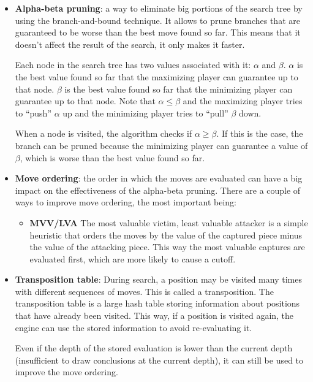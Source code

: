 \begin{itemize}
\item \textbf{Alpha-beta pruning}: a way to eliminate big portions of the search tree by using the branch-and-bound technique. It allows to prune branches that are guaranteed to be worse than the best move found so far. This means that it doesn't affect the result of the search, it only makes it faster.

Each node in the search tree has two values associated with it: $\alpha$ and $\beta$. $\alpha$ is the best value found so far that the maximizing player can guarantee up to that node. $\beta$ is the best value found so far that the minimizing player can guarantee up to that node. Note that $\alpha \le \beta$ and the maximizing player tries to \enquote{push} $\alpha$ up and the minimizing player tries to \enquote{pull} $\beta$ down.

When a node is visited, the algorithm checks if $\alpha \ge \beta$. If this is the case, the branch can be pruned because the minimizing player can guarantee a value of $\beta$, which is worse than the best value found so far.

\item \textbf{Move ordering}: the order in which the moves are evaluated can have a big impact on the effectiveness of the alpha-beta pruning. There are a couple of ways to improve move ordering, the most important being:
\begin{itemize}
\item \textbf{MVV/LVA} The most valuable victim, least valuable attacker is a simple heuristic that orders the moves by the value of the captured piece minus the value of the attacking piece. This way the most valuable captures are evaluated first, which are more likely to cause a cutoff.
\end{itemize}

\item \textbf{Transposition table}: During search, a position may be visited many times with different sequences of moves. This is called a transposition. The transposition table is a large hash table storing information about positions that have already been visited. This way, if a position is visited again, the engine can use the stored information to avoid re-evaluating it.

Even if the depth of the stored evaluation is lower than the current depth (insufficient to draw conclusions at the current depth), it can still be used to improve the move ordering.

\end{itemize}

